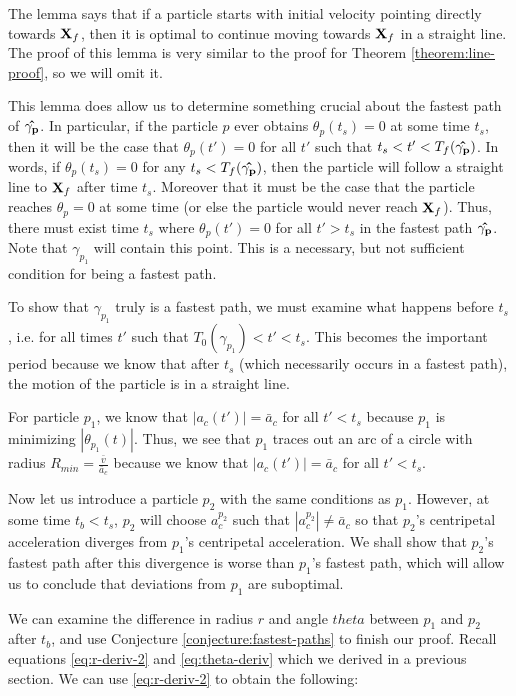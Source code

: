 The lemma says that if a particle starts with initial velocity pointing directly towards $\mathbf{X}_f$, then it is optimal to continue moving towards $\mathbf{X}_f$ in a straight line. The proof of this lemma is very similar to the proof for Theorem \ref{theorem:line-proof}, so we will omit it.

This lemma does allow us to determine something crucial about the fastest path of $\mathbf{\hat{\gamma_{p}}}$. In particular, if the particle $p$ ever obtains $\theta_p(t_s) = 0$ at some time $t_s$, then it will be the case that $\theta_p(t') = 0$ for all $t'$ such that $t_s < t' < T_f(\mathbf{\hat{\gamma_p}})$. In words, if $\theta_p(t_s) = 0$ for any $t_s < T_f(\mathbf{\hat{\gamma_p}})$, then the particle will follow a straight line to $\mathbf{X}_f$ after time $t_s$. Moreover that it must be the case that the particle reaches $\theta_p = 0$ at some time (or else the particle would never reach $\mathbf{X}_f$). Thus, there must exist time $t_s$ where $\theta_p(t') = 0$ for all $t' > t_s$ in the fastest path $\mathbf{\hat{\gamma_p}}$. Note that $\gamma_{p_1}$ will contain this point. This is a necessary, but not sufficient condition for being a fastest path.

To show that $\gamma_{p_1}$ truly is a fastest path, we must examine what happens before $t_s$, i.e. for all times $t'$ such that $T_0(\gamma_{p_1}) < t' < t_s$. This becomes the important period because we know that after $t_s$ (which necessarily occurs in a fastest path), the motion of the particle is in a straight line.

For particle $p_1$, we know that $|a_c(t')| = \bar{a}_c$ for all $t' < t_s$ because $p_1$ is minimizing $|\theta_{p_1}(t)|$. Thus, we see that $p_1$ traces out an arc of a circle with radius $R_{min} = \frac{\bar{v}}{\bar{a}_c}$ because we know that $|a_c(t')| = \bar{a}_c$ for all $t' < t_s$.

Now let us introduce a particle $p_2$ with the same conditions as $p_1$. However, at some time $t_b < t_s$, $p_2$ will choose $a^{p_2}_c$ such that $|a^{p_2}_c| \neq \bar{a}_c$ so that $p_2$'s centripetal acceleration diverges from $p_1$'s centripetal acceleration. We shall show that $p_2$'s fastest path after this divergence is worse than $p_1$'s fastest path, which will allow us to conclude that deviations from $p_1$ are suboptimal.

We can examine the difference in radius $r$ and angle $theta$ between $p_1$ and $p_2$ after $t_b$, and use Conjecture \ref{conjecture:fastest-paths} to finish our proof. Recall equations \ref{eq:r-deriv-2} and \ref{eq:theta-deriv} which we derived in a previous section. We can use \ref{eq:r-deriv-2} to obtain the following:

